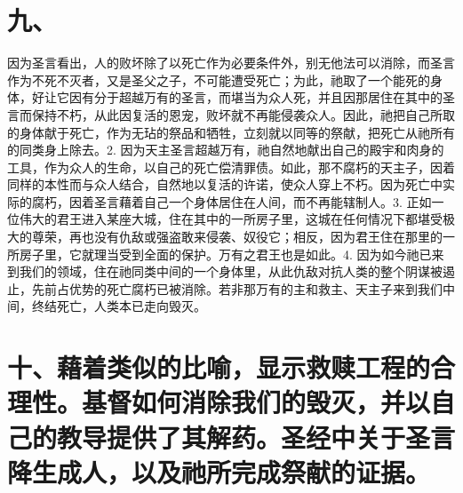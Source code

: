
\section{九、}

因为圣言看出，人的败坏除了以死亡作为必要条件外，别无他法可以消除，而圣言作为不死不灭者，又是圣父之子，不可能遭受死亡；为此，祂取了一个能死的身体，好让它因有分于超越万有的圣言，而堪当为众人死，并且因那居住在其中的圣言而保持不朽，从此因复活的恩宠，败坏就不再能侵袭众人。因此，祂把自己所取的身体献于死亡，作为无玷的祭品和牺牲，立刻就以同等的祭献，把死亡从祂所有的同类身上除去。2. 因为天主圣言超越万有，祂自然地献出自己的殿宇和肉身的工具，作为众人的生命，以自己的死亡偿清罪债。如此，那不腐朽的天主子，因着同样的本性而与众人结合，自然地以复活的许诺，使众人穿上不朽。因为死亡中实际的腐朽，因着圣言藉着自己一个身体居住在人间，而不再能辖制人。3. 正如一位伟大的君王进入某座大城，住在其中的一所房子里，这城在任何情况下都堪受极大的尊荣，再也没有仇敌或强盗敢来侵袭、奴役它；相反，因为君王住在那里的一所房子里，它就理当受到全面的保护。万有之君王也是如此。4. 因为如今祂已来到我们的领域，住在祂同类中间的一个身体里，从此仇敌对抗人类的整个阴谋被遏止，先前占优势的死亡腐朽已被消除。若非那万有的主和救主、天主子来到我们中间，终结死亡，人类本已走向毁灭。\par


\section{十、藉着类似的比喻，显示救赎工程的合理性。基督如何消除我们的毁灭，并以自己的教导提供了其解药。圣经中关于圣言降生成人，以及祂所完成祭献的证据。}

